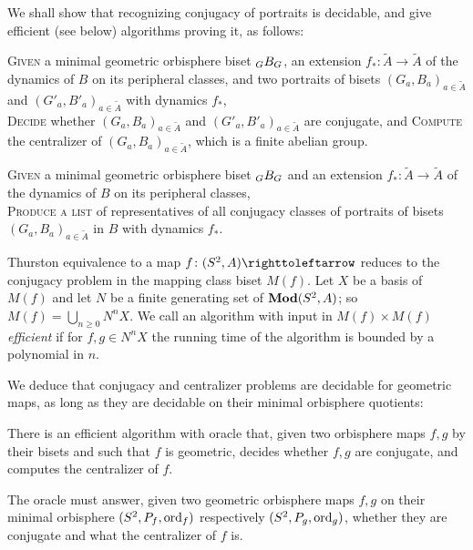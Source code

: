 \documentclass{amsart}
\newcommand\wtA{{\widetilde A}}
\begin{document}
We shall show that recognizing conjugacy of portraits is decidable, and
give efficient (see below) algorithms proving it, as follows:
\begin{algo}[= Algorithms~\ref{algo:conjportraittor} and~\ref{algo:conjportraitexp}]\label{algo:conjportrait}
  \textsc{Given} a minimal geometric orbisphere biset $\subscript G B_G$, an extension $f_*\colon\wtA\to\wtA$ of the dynamics of $B$ on its peripheral classes, and two portraits of bisets $(G_a,B_a)_{a\in\wtA}$ and $(G'_a,B'_a)_{a\in\wtA}$ with dynamics $f_*$,\\
  \textsc{Decide} whether $(G_a,B_a)_{a\in\wtA}$ and
  $(G'_a,B'_a)_{a\in\wtA}$ are conjugate, and \textsc{Compute}
  the centralizer of $(G_a,B_a)_{a\in\wtA}$, which is a finite
  abelian group.
\end{algo}

\begin{algo}[= Algorithms~\ref{algo:listportraittor} and~\ref{algo:listportraitexp}]\label{algo:listportrait}
  \textsc{Given} a minimal geometric orbisphere biset $\subscript G B_G$ and an extension $f_*\colon\wtA\to\wtA$ of the dynamics of $B$ on its peripheral classes,\\
  \textsc{Produce a list} of representatives of all conjugacy classes of portraits of bisets $(G_a,B_a)_{a\in\wtA}$ in $B$ with dynamics $f_*$.
\end{algo}

Thurston equivalence to a map $f\colon(S^2,A)\selfmap$ reduces to the
conjugacy problem in the mapping class biset $M(f)$. Let $X$ be a
basis of $M(f)$ and let $N$ be a finite generating set of
$\mathbf{\relax Mod}(S^2,A)$; so $M(f)=\bigcup_{n\ge0} N^n X$. We call an algorithm
with input in $M(f)\times M(f)$ \emph{efficient} if for $f,g\in N^n X$
the running time of the algorithm is bounded by a polynomial in $n$.

We deduce that conjugacy and centralizer problems are decidable for
geometric maps, as long as they are decidable on their minimal
orbisphere quotients:
\begin{maincor}[= Algorithm~\ref{algo:red}]\label{cor:conjZpb}
  There is an efficient algorithm with oracle that, given two
  orbisphere maps $f,g$ by their bisets and such that $f$ is
  geometric, decides whether $f,g$ are conjugate, and computes the
  centralizer of $f$.

  The oracle must answer, given two geometric orbisphere maps $f,g$ on
  their minimal orbisphere $(S^2,P_f,\operatorname{ord}_f)$ respectively
  $(S^2,P_g,\operatorname{ord}_g)$, whether they are conjugate and what the
  centralizer of $f$ is.
\end{maincor}
\end{document}
